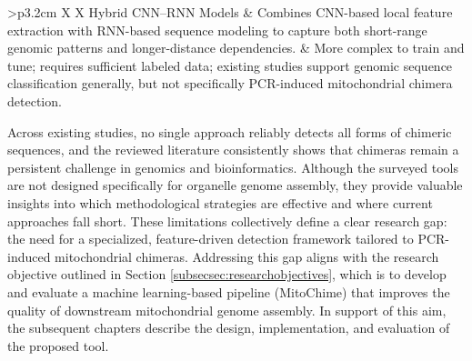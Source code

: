 \begin{landscape}
\begin{xltabular}{\linewidth}{>{\bfseries}p{3.2cm} X X}
    Hybrid CNN--RNN Models &
    Combines CNN-based local feature extraction with RNN-based sequence modeling to capture both short-range genomic patterns and longer-distance dependencies. &
    More complex to train and tune; requires sufficient labeled data; existing studies support genomic sequence classification generally, but not specifically PCR-induced mitochondrial chimera detection. \\

\end{xltabular}

\end{landscape}
\restoregeometry


Across existing studies, no single approach reliably detects all forms of chimeric sequences, and the reviewed literature consistently shows that chimeras remain a persistent challenge in genomics and bioinformatics. Although the surveyed tools are not designed specifically for organelle genome assembly, they provide valuable insights into which methodological strategies are effective and where current approaches fall short. These limitations collectively define a clear research gap: the need for a specialized, feature-driven detection framework tailored to PCR-induced mitochondrial chimeras. Addressing this gap aligns with the research objective outlined in Section \ref{subsecsec:researchobjectives}, which is to develop and evaluate a machine learning-based pipeline (MitoChime) that improves the quality of downstream mitochondrial genome assembly. In support of this aim, the subsequent chapters describe the design, implementation, and evaluation of the proposed tool.